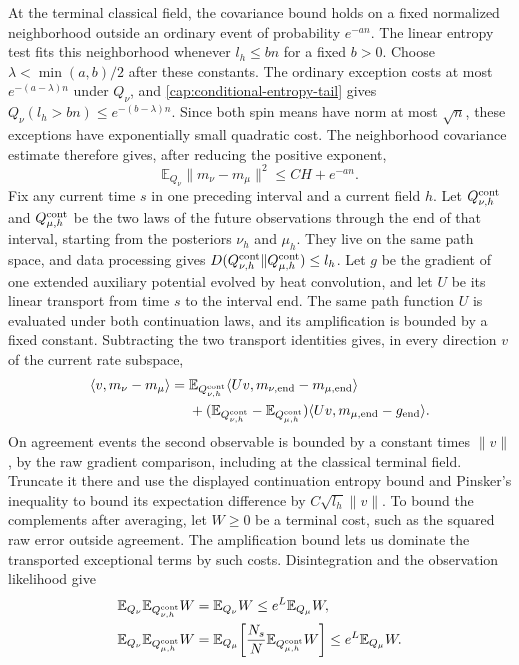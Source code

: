 At the terminal classical field, the covariance bound holds on a fixed
normalized neighborhood outside an ordinary event of probability $e^{-an}$.
The linear entropy test fits this neighborhood whenever $l_h\le bn$ for a
fixed $b>0$. Choose $\lambda<\min(a,b)/2$ after these constants. The ordinary
exception costs at most $e^{-(a-\lambda)n}$ under $Q_\nu$, and
\eqref{cap:conditional-entropy-tail} gives
$Q_\nu(l_h>bn)\le e^{-(b-\lambda)n}$. Since both spin means have norm at
most $\sqrt n$, these exceptions have exponentially small quadratic cost.
The neighborhood covariance estimate therefore gives, after reducing the
positive exponent,
\[
 \mathbb E_{Q_\nu}\|m_\nu-m_\mu\|^2\le CH+e^{-an}.
\]
Fix any current time $s$ in one preceding interval and a current field $h$.
Let $Q_{\nu,h}^{\rm cont}$ and $Q_{\mu,h}^{\rm cont}$ be the two laws of the
future observations through the end of that interval, starting from the
posteriors $\nu_h$ and $\mu_h$. They live on the same path space, and data
processing gives
$D(Q_{\nu,h}^{\rm cont}\Vert Q_{\mu,h}^{\rm cont})\le l_h$.
Let $g$ be the gradient of one extended auxiliary potential evolved by heat
convolution, and let $U$ be its linear transport from time $s$ to the interval
end. The same path function $U$ is evaluated under both continuation laws,
and its amplification is bounded by a fixed constant. Subtracting the two
transport identities gives, in every direction $v$ of the current rate subspace,
\begin{align*}
 \langle v,m_\nu-m_\mu\rangle
 ={}&\mathbb E_{Q_{\nu,h}^{\rm cont}}
       \langle Uv,m_{\nu,\rm end}-m_{\mu,\rm end}\rangle\\
 &+(\mathbb E_{Q_{\nu,h}^{\rm cont}}-\mathbb E_{Q_{\mu,h}^{\rm cont}})
       \langle Uv,m_{\mu,\rm end}-g_{\rm end}\rangle.
\end{align*}
On agreement events the second observable is bounded by a constant times
$\|v\|$, by the raw gradient comparison, including at the classical terminal
field. Truncate it there and use the displayed continuation entropy bound and
Pinsker's inequality to bound its expectation difference by
$C\sqrt{l_h}\|v\|$. To bound the complements after averaging, let $W\ge0$
be a terminal cost, such as the squared raw error outside agreement. The
amplification bound lets us dominate the transported exceptional terms by
such costs. Disintegration and the observation likelihood give
\[
 \begin{split}
 \mathbb E_{Q_\nu}\mathbb E_{Q_{\nu,h}^{\rm cont}}W
   &=\mathbb E_{Q_\nu}W
     \le e^L\mathbb E_{Q_\mu}W,\\
 \mathbb E_{Q_\nu}\mathbb E_{Q_{\mu,h}^{\rm cont}}W
   &=\mathbb E_{Q_\mu}\!\left[
      \frac{N_s}{N}\mathbb E_{Q_{\mu,h}^{\rm cont}}W\right]
     \le e^L\mathbb E_{Q_\mu}W.
 \end{split}
\]
